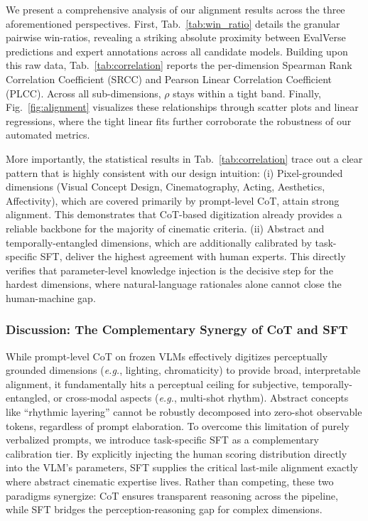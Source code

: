 \documentclass{article}
\begin{document}
We present a comprehensive analysis of our alignment results across the three aforementioned perspectives. First, Tab.~\ref{tab:win_ratio} details the granular pairwise win-ratios, revealing a striking absolute proximity between EvalVerse predictions and expert annotations across all candidate models. Building upon this raw data, Tab.~\ref{tab:correlation} reports the per-dimension Spearman Rank Correlation Coefficient (SRCC) and Pearson Linear Correlation Coefficient (PLCC). Across all sub-dimensions, $\rho$ stays within a tight band. Finally, Fig.~\ref{fig:alignment} visualizes these relationships through scatter plots and linear regressions, where the tight linear fits further corroborate the robustness of our automated metrics. 

More importantly, the statistical results in Tab.~\ref{tab:correlation} trace out a clear pattern that is highly consistent with our design intuition: (i) Pixel-grounded dimensions (Visual Concept Design, Cinematography, Acting, Aesthetics, Affectivity), which are covered primarily by prompt-level CoT, attain strong alignment. This demonstrates that CoT-based digitization already provides a reliable backbone for the majority of cinematic criteria. (ii) Abstract and temporally-entangled dimensions, which are additionally calibrated by task-specific SFT, deliver the highest agreement with human experts. This directly verifies that parameter-level knowledge injection is the decisive step for the hardest dimensions, where natural-language rationales alone cannot close the human-machine gap.

\subsubsection{Discussion: The Complementary Synergy of CoT and SFT}

While prompt-level CoT on frozen VLMs effectively digitizes perceptually grounded dimensions (\emph{e.g.}, lighting, chromaticity) to provide broad, interpretable alignment, it fundamentally hits a perceptual ceiling for subjective, temporally-entangled, or cross-modal aspects (\emph{e.g.}, multi-shot rhythm). Abstract concepts like ``rhythmic layering'' cannot be robustly decomposed into zero-shot observable tokens, regardless of prompt elaboration. To overcome this limitation of purely verbalized prompts, we introduce task-specific SFT as a complementary calibration tier. By explicitly injecting the human scoring distribution directly into the VLM's parameters, SFT supplies the critical last-mile alignment exactly where abstract cinematic expertise lives. Rather than competing, these two paradigms synergize: CoT ensures transparent reasoning across the pipeline, while SFT bridges the perception-reasoning gap for complex dimensions. 
\end{document}
